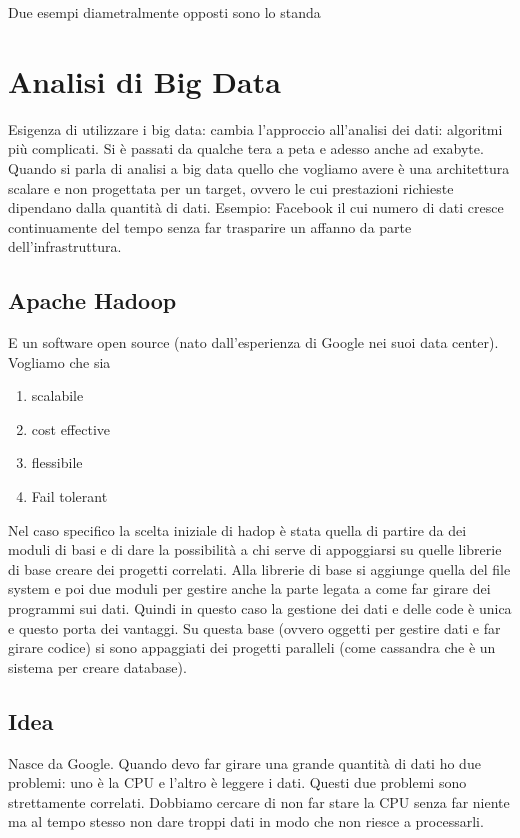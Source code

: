 \documentclass[italian,]{article}
\providecommand{\tightlist}{%
  \setlength{\itemsep}{0pt}\setlength{\parskip}{0pt}}
\begin{document}
Due esempi diametralmente opposti sono lo standa

\section{Analisi di Big Data}\label{analisi-di-big-data}

Esigenza di utilizzare i big data: cambia l'approccio all'analisi dei
dati: algoritmi più complicati. Si è passati da qualche tera a peta e
adesso anche ad exabyte. Quando si parla di analisi a big data quello
che vogliamo avere è una architettura scalare e non progettata per un
target, ovvero le cui prestazioni richieste dipendano dalla quantità di
dati. Esempio: Facebook il cui numero di dati cresce continuamente del
tempo senza far trasparire un affanno da parte dell'infrastruttura.

\subsection{Apache Hadoop}\label{apache-hadoop}

E un software open source (nato dall'esperienza di Google nei suoi data
center). Vogliamo che sia

\begin{enumerate}
\def\labelenumi{\arabic{enumi}.}
\tightlist
\item
  scalabile
\item
  cost effective
\item
  flessibile
\item
  Fail tolerant
\end{enumerate}

Nel caso specifico la scelta iniziale di hadop è stata quella di partire
da dei moduli di basi e di dare la possibilità a chi serve di
appoggiarsi su quelle librerie di base creare dei progetti correlati.
Alla librerie di base si aggiunge quella del file system e poi due
moduli per gestire anche la parte legata a come far girare dei programmi
sui dati. Quindi in questo caso la gestione dei dati e delle code è
unica e questo porta dei vantaggi. Su questa base (ovvero oggetti per
gestire dati e far girare codice) si sono appaggiati dei progetti
paralleli (come cassandra che è un sistema per creare database).
\subsection{Idea} Nasce da Google. Quando devo far girare una grande
quantità di dati ho due problemi: uno è la CPU e l'altro è leggere i
dati. Questi due problemi sono strettamente correlati. Dobbiamo cercare
di non far stare la CPU senza far niente ma al tempo stesso non dare
troppi dati in modo che non riesce a processarli.
\end{document}
